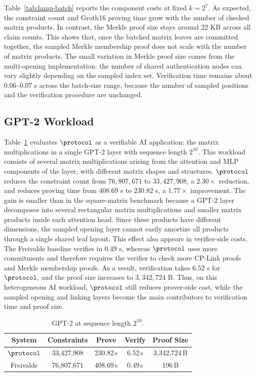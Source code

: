 Table~\ref{tab:lamp-batch} reports the component costs at fixed \(k=2^7\).
As expected, the constraint count and Groth16 proving time grow with the number
of checked matrix products.  In contrast, the Merkle proof size stays around
\(22\) KB across all claim counts.  This shows that, once the batched matrix
leaves are committed together, the sampled Merkle membership proof does not
scale with the number of matrix products.  The small variation in Merkle proof
size comes from the multi-opening implementation: the number of shared
authentication nodes can vary slightly depending on the sampled index set.
Verification time remains about \(0.06\)--\(0.07\) s across the batch-size
range, because the number of sampled positions and the verification procedure
are unchanged.

\subsection{GPT-2 Workload}
\label{sec:eval-gpt2}

Table~\ref{tab:lamp-gpt2} evaluates \(\protocol\) as a verifiable AI
application: the matrix multiplications in a single GPT-2 layer with sequence
length \(2^{10}\).  This workload consists of several matrix multiplications
arising from the attention and MLP components of the layer, with different
matrix shapes and structures.
\(\protocol\) reduces the constraint count from \(76{,}807{,}671\) to
\(33{,}427{,}908\), a \(2.30\times\) reduction, and reduces proving time from
\(408.69\) s to \(230.82\) s, a \(1.77\times\) improvement.  The gain is smaller
than in the square-matrix benchmark because a GPT-2 layer decomposes into
several rectangular matrix multiplications and smaller matrix products inside
each attention head.  Since these products have different dimensions, the
sampled opening layer cannot easily amortize all products through a single
shared leaf layout.
This effect also appears in verifier-side costs.  The Freivalds baseline
verifies in \(0.49\) s, whereas \(\protocol\) uses more commitments and therefore
requires the verifier to check more CP-Link proofs and Merkle membership proofs.
As a result, verification takes \(6.52\) s for \(\protocol\), and the proof size
increases to \(3{,}342{,}724\) B.  Thus, on this heterogeneous AI workload,
\(\protocol\) still reduces prover-side cost, while the sampled opening and
linking layers become the main contributors to verification time and proof size.

\begin{table}[H]
\centering
\setlength{\tabcolsep}{3pt}
\begin{tabular*}{\columnwidth}{@{\extracolsep{\fill}}ccccc@{}}
\toprule
\textbf{System} & \textbf{Constraints} & \textbf{Prove} & \textbf{Verify} & \textbf{Proof Size} \\
\midrule
\(\protocol\) & 33{,}427{,}908 & 230.82\,s & 6.52\,s & 3{,}342{,}724\,B \\
Freivalds & 76{,}807{,}671 & 408.69\,s & 0.49\,s & 196\,B \\
\bottomrule
\end{tabular*}
\vspace{6pt}
\caption{GPT-2 at sequence length \(2^{10}\).}
\label{tab:lamp-gpt2}
\end{table}
